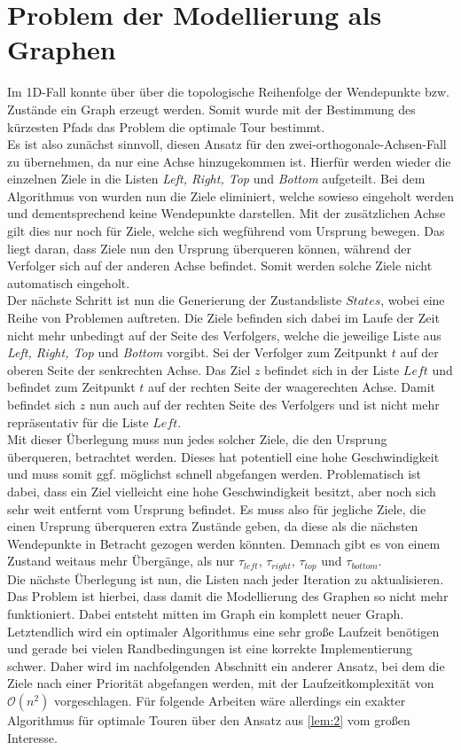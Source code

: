 \documentclass[german,version-2019-11]{uzl-thesis}
\begin{document}
\section{Problem der Modellierung als Graphen}
Im 1D-Fall konnte über über die topologische Reihenfolge der Wendepunkte bzw. Zustände ein Graph erzeugt werden. Somit wurde mit der Bestimmung des kürzesten Pfads das Problem die optimale Tour bestimmt. \\
Es ist also zunächst sinnvoll, diesen Ansatz für den zwei-orthogonale-Achsen-Fall zu übernehmen, da nur eine Achse hinzugekommen ist. Hierfür werden wieder die einzelnen Ziele in die Listen \emph{Left, Right, Top} und \emph{Bottom} aufgeteilt. Bei dem Algorithmus von \cite{helvig} wurden nun die Ziele eliminiert, welche sowieso eingeholt werden und dementsprechend keine Wendepunkte darstellen. Mit der zusätzlichen Achse gilt dies nur noch für Ziele, welche sich wegführend vom Ursprung bewegen. Das liegt daran, dass Ziele nun den Ursprung überqueren können, während der Verfolger sich auf der anderen Achse befindet. Somit werden solche Ziele nicht automatisch eingeholt. \\
Der nächste Schritt ist nun die Generierung der Zustandsliste $States$, wobei eine Reihe von Problemen auftreten. Die Ziele befinden sich dabei im Laufe der Zeit nicht mehr unbedingt auf der Seite des Verfolgers, welche die jeweilige Liste aus \emph{Left, Right, Top} und \emph{Bottom} vorgibt. Sei der Verfolger zum Zeitpunkt $t$ auf der oberen Seite der senkrechten Achse. Das Ziel $z$ befindet sich in der Liste $Left$ und befindet zum Zeitpunkt $t$ auf der rechten Seite der waagerechten Achse. Damit befindet sich $z$ nun auch auf der rechten Seite des Verfolgers und ist nicht mehr repräsentativ für die Liste $Left$. \\
Mit dieser Überlegung muss nun jedes solcher Ziele, die den Ursprung überqueren, betrachtet werden. Dieses hat potentiell eine hohe Geschwindigkeit und muss somit ggf. möglichst schnell abgefangen werden. Problematisch ist dabei, dass ein Ziel vielleicht eine hohe Geschwindigkeit besitzt, aber noch sich sehr weit entfernt vom Ursprung befindet. Es muss also für jegliche Ziele, die einen Ursprung überqueren extra Zustände geben, da diese als die nächsten Wendepunkte in Betracht gezogen werden könnten. Demnach gibt es von einem Zustand weitaus mehr Übergänge, als nur $\tau_{left}$, $\tau_{right}$, $\tau_{top}$ und $\tau_{bottom}$. \\
Die nächste Überlegung ist nun, die Listen nach jeder Iteration zu aktualisieren. Das Problem ist hierbei, dass damit die Modellierung des Graphen so nicht mehr funktioniert. Dabei entsteht mitten im Graph ein komplett neuer Graph.  \\
Letztendlich wird ein optimaler Algorithmus eine sehr große Laufzeit benötigen und gerade bei vielen Randbedingungen ist eine korrekte Implementierung schwer. Daher wird im nachfolgenden Abschnitt ein anderer Ansatz, bei dem die Ziele nach einer Priorität abgefangen werden, mit der Laufzeitkomplexität von $\mathcal{O}(n^2)$ vorgeschlagen. Für folgende Arbeiten wäre allerdings ein exakter Algorithmus für optimale Touren über den Ansatz aus \ref{lem:2} vom großen Interesse.
\end{document}
